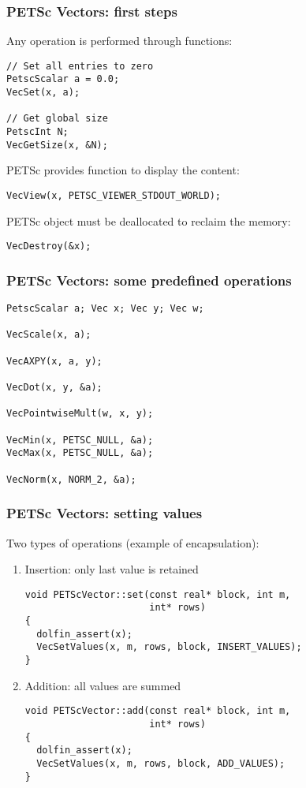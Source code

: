 \begin{frame}[fragile]
  \frametitle{PETSc Vectors: first steps}

\medskip
Any operation is performed through functions:
\begin{lstlisting}[style=c]
// Set all entries to zero
PetscScalar a = 0.0;
VecSet(x, a);

// Get global size
PetscInt N;
VecGetSize(x, &N);

\end{lstlisting}

PETSc provides function to display the content:
\begin{lstlisting}[style=c]
VecView(x, PETSC_VIEWER_STDOUT_WORLD);
\end{lstlisting}

PETSc object must be deallocated to reclaim the memory:
\begin{lstlisting}[style=c]
VecDestroy(&x);
\end{lstlisting}

\end{frame}

\begin{frame}[fragile]
  \frametitle{PETSc Vectors: some predefined operations}
\begin{lstlisting}[style=c]
PetscScalar a; Vec x; Vec y; Vec w;

VecScale(x, a);

VecAXPY(x, a, y);

VecDot(x, y, &a);

VecPointwiseMult(w, x, y);

VecMin(x, PETSC_NULL, &a);
VecMax(x, PETSC_NULL, &a);

VecNorm(x, NORM_2, &a);
\end{lstlisting}

\end{frame}

\begin{frame}[fragile]
  \frametitle{PETSc Vectors: setting values}

Two types of operations (example of encapsulation):
\begin{enumerate}
\item Insertion: only last value is retained
\begin{lstlisting}[style=c]
void PETScVector::set(const real* block, int m, 
                      int* rows)
{
  dolfin_assert(x);
  VecSetValues(x, m, rows, block, INSERT_VALUES);
}
\end{lstlisting}
\item Addition: all values are summed
\begin{lstlisting}[style=c]
void PETScVector::add(const real* block, int m,
                      int* rows)
{
  dolfin_assert(x);
  VecSetValues(x, m, rows, block, ADD_VALUES);
}
\end{lstlisting}
\end{enumerate}
\end{frame}

